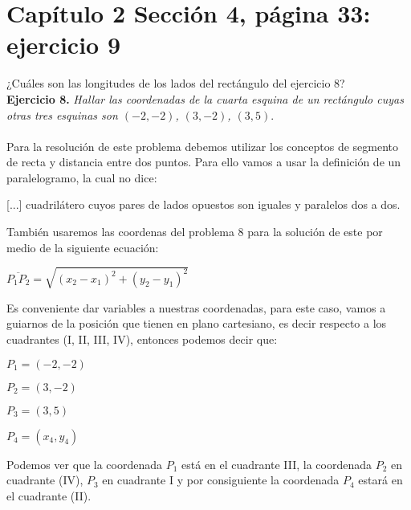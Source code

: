 \documentclass[12pt]{article}
\begin{document}
\section{Capítulo 2 Sección 4, página 33: ejercicio 9}

¿Cuáles son las longitudes de los lados del rectángulo del ejercicio 8?\\

\textbf{Ejercicio 8.} \textit{Hallar las coordenadas de la cuarta esquina de un rectángulo cuyas otras tres esquinas son $(-2,-2)$, $(3,-2)$, $(3,5)$}.\\

{} \\

Para la resolución de este problema debemos utilizar los conceptos de segmento de recta y distancia entre dos puntos. Para ello vamos a usar la definición de un paralelogramo, la cual no dice:

\begin{center}
    [...] cuadrilátero cuyos pares de lados opuestos son iguales y paralelos dos a dos.
\end{center}

También usaremos las coordenas del problema 8 para la solución de este por medio de la siguiente ecuación:

\begin{center}
    $\overline{P_1P_2}=\sqrt{(x_2-x_1)^{2}+(y_2-y_1)^2}$
\end{center}

Es conveniente dar variables a nuestras coordenadas, para este caso, vamos a guiarnos de la posición que tienen en plano cartesiano, es decir respecto a los cuadrantes (I, II, III, IV), entonces podemos decir que:

\begin{center}
    $P_1 = (-2,-2)$
\end{center}
\begin{center}
    $P_2 = (3,-2)$
\end{center}
\begin{center}
    $P_3 = (3,5)$
\end{center}
\begin{center}
    $P_4 = (x_4,y_4)$
\end{center}

Podemos ver que la coordenada $P_1$ está en el cuadrante III, la coordenada $P_2$ en cuadrante (IV), $P_3$ en cuadrante I y por consiguiente la coordenada $P_4$ estará en el cuadrante (II).\\ 
\end{document}
